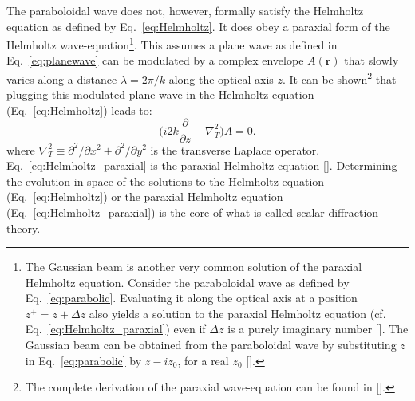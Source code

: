 \begin{refsection}
The paraboloidal wave does not, however, formally satisfy the Helmholtz equation as defined by Eq.~\ref{eq:Helmholtz}. It does obey a paraxial form of the Helmholtz wave-equation\footnote{The Gaussian beam is another very common solution of the paraxial Helmholtz equation. Consider the paraboloidal wave as defined by Eq.~\ref{eq:parabolic}. Evaluating it along the optical axis at a position $z^+=z+\Delta z$ also yields a solution to the paraxial Helmholtz equation (cf. Eq.~\ref{eq:Helmholtz_paraxial}) even if $\Delta z$ is a purely imaginary number [\cite[\textit{Exercise 2.2-2}]{Saleh2019}]. The Gaussian beam can be obtained from the paraboloidal wave by substituting $z$ in Eq.~\ref{eq:parabolic} by $z-iz_0$, for a real $z_0$ [\cite[\textit{§3.1}]{Saleh2019}].
}. This assumes a plane wave as defined in Eq.~\ref{eq:planewave} can be modulated by a complex envelope $A(\textbf{r})$ that slowly varies along a distance $\lambda=2\pi/k$ along the optical axis $z$. It can be shown\footnote{The complete derivation of the paraxial wave-equation can be found in [\cite[\textit{§2.2.C}]{Saleh2019}].} that plugging this modulated plane-wave in the Helmholtz equation (Eq.~\ref{eq:Helmholtz}) leads to:
\begin{equation}\label{eq:Helmholtz_paraxial}
    \Bigg(i2k\frac{\partial}{\partial z}-\nabla^2_T\Bigg)A=0.
\end{equation}
where $\nabla^2_T\equiv\partial^2/\partial x^2 + \partial^2/\partial y^2$ is the transverse Laplace operator. Eq.~\ref{eq:Helmholtz_paraxial} is the paraxial Helmholtz equation [\cite[\textit{§2.2}]{Saleh2019}]. Determining the evolution in space of the solutions to the Helmholtz equation (Eq.~\ref{eq:Helmholtz}) or the paraxial Helmholtz equation (Eq.~\ref{eq:Helmholtz_paraxial}) is the core of what is called scalar diffraction theory.


\end{refsection}
